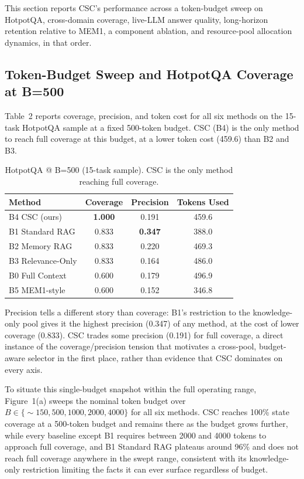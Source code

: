 \documentclass{article}
\begin{document}
This section reports CSC's performance across a token-budget sweep on HotpotQA, cross-domain coverage, live-LLM answer quality, long-horizon retention relative to MEM1, a component ablation, and resource-pool allocation dynamics, in that order.

\subsection{Token-Budget Sweep and HotpotQA Coverage at B=500}

Table~2 reports coverage, precision, and token cost for all six methods on the 15-task HotpotQA sample at a fixed 500-token budget. CSC (B4) is the only method to reach full coverage at this budget, at a lower token cost (459.6) than B2 and B3.

\begin{table}[t]
\caption{HotpotQA @ B=500 (15-task sample). CSC is the only method reaching full coverage.}
\centering
\begin{tabular}{lccc}
\toprule
Method & Coverage & Precision & Tokens Used \\
\midrule
B4 CSC (ours) & \textbf{1.000} & 0.191 & 459.6 \\
B1 Standard RAG & 0.833 & \textbf{0.347} & 388.0 \\
B2 Memory RAG & 0.833 & 0.220 & 469.3 \\
B3 Relevance-Only & 0.833 & 0.164 & 486.0 \\
B0 Full Context & 0.600 & 0.179 & 496.9 \\
B5 MEM1-style & 0.600 & 0.152 & 346.8 \\
\bottomrule
\end{tabular}
\end{table}

Precision tells a different story than coverage: B1's restriction to the knowledge-only pool gives it the highest precision (0.347) of any method, at the cost of lower coverage (0.833). CSC trades some precision (0.191) for full coverage, a direct instance of the coverage/precision tension that motivates a cross-pool, budget-aware selector in the first place, rather than evidence that CSC dominates on every axis.

To situate this single-budget snapshot within the full operating range, Figure~1(a) sweeps the nominal token budget over $B \in \{\sim\!150, 500, 1000, 2000, 4000\}$ for all six methods. CSC reaches 100\% state coverage at a 500-token budget and remains there as the budget grows further, while every baseline except B1 requires between 2000 and 4000 tokens to approach full coverage, and B1 Standard RAG plateaus around 96\% and does not reach full coverage anywhere in the swept range, consistent with its knowledge-only restriction limiting the facts it can ever surface regardless of budget.
\end{document}
